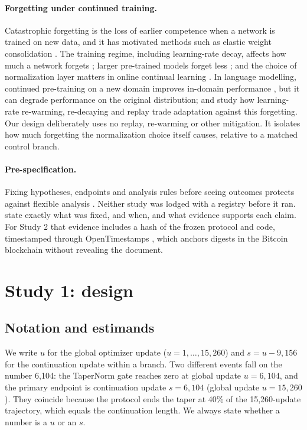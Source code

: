 \documentclass[11pt]{article}
\begin{document}
\paragraph{Forgetting under continued training.} Catastrophic forgetting
\citep{mccloskey1989catastrophic,french1999catastrophic} is the loss of earlier competence when a network is
trained on new data, and it has motivated methods such as elastic weight consolidation
\citep{kirkpatrick2017overcoming}. The training regime, including learning-rate decay, affects how much a network
forgets \citep{mirzadeh2020training}; larger pre-trained models forget less \citep{ramasesh2022scale}; and the
choice of normalization layer matters in online continual learning \citep{pham2022continual}. In language
modelling, continued pre-training on a new domain improves in-domain performance \citep{gururangan2020dont}, but
it can degrade performance on the original distribution; \citet{gupta2023rewarm} and \citet{ibrahim2024simple}
study how learning-rate re-warming, re-decaying and replay trade adaptation against this forgetting. Our design
deliberately uses no replay, re-warming or other mitigation. It isolates how much forgetting the normalization
choice itself causes, relative to a matched control branch.

\paragraph{Pre-specification.} Fixing hypotheses, endpoints and analysis rules before seeing outcomes protects
against flexible analysis \citep{nosek2018preregistration}. Neither study was lodged with a registry before it ran.
 state exactly what was fixed, and when, and what evidence supports each claim.
For Study 2 that evidence includes a hash of the frozen protocol and code, timestamped through OpenTimestamps
\citep{todd2016opentimestamps}, which anchors digests in the Bitcoin blockchain without revealing the document.

\section{Study 1: design}
\label{sec:design}

\subsection{Notation and estimands}
\label{sec:estimands}

We write $u$ for the global optimizer update ($u = 1,\dots,15{,}260$) and $s = u - 9{,}156$ for the continuation
update within a branch. Two different events fall on the number 6{,}104: the TaperNorm gate reaches zero at global
update $u = 6{,}104$, and the primary endpoint is continuation update $s = 6{,}104$ (global update $u = 15{,}260$).
They coincide because the protocol ends the taper at 40\% of the 15{,}260-update trajectory, which equals the
continuation length. We always state whether a number is a $u$ or an $s$.
\end{document}
